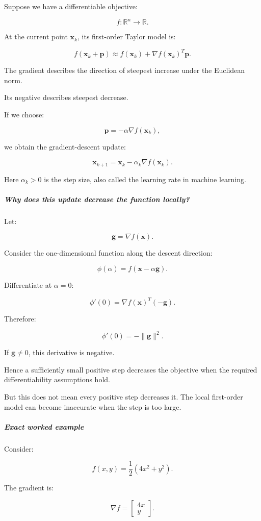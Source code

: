 Suppose we have a differentiable objective:

\[
f:\mathbb R^n\to\mathbb R.
\]

At the current point \(\mathbf x_k\), its first-order Taylor model is:

\[
f(\mathbf x_k+\mathbf p) \approx f(\mathbf x_k)+\nabla f(\mathbf x_k)^T\mathbf p.
\]

The gradient describes the direction of steepest increase under the Euclidean norm.

Its negative describes steepest decrease.

If we choose:

\[
\mathbf p=-\alpha\nabla f(\mathbf x_k),
\]

we obtain the gradient-descent update:

\[
\boxed{ \mathbf x_{k+1} = \mathbf x_k-\alpha_k\nabla f(\mathbf x_k) }.
\]

Here \(\alpha_k>0\) is the step size, also called the learning rate in machine learning.

\subparagraph{Why does this update decrease the function locally?}\label{why-does-this-update-decrease-the-function-locally}

Let:

\[
\mathbf g=\nabla f(\mathbf x).
\]

Consider the one-dimensional function along the descent direction:

\[
\phi(\alpha)=f(\mathbf x-\alpha\mathbf g).
\]

Differentiate at \(\alpha=0\):

\[
\phi'(0)= \nabla f(\mathbf x)^T(-\mathbf g).
\]

Therefore:

\[
\boxed{ \phi'(0)=-\|\mathbf g\|^2 }.
\]

If \(\mathbf g\ne0\), this derivative is negative.

Hence a sufficiently small positive step decreases the objective when the required differentiability assumptions hold.

But this does not mean every positive step decreases it. The local first-order model can become inaccurate when the step is too large.

\subparagraph{Exact worked example}\label{exact-worked-example}

Consider:

\[
f(x,y)=\frac12(4x^2+y^2).
\]

The gradient is:

\[
\nabla f= \begin{bmatrix} 4x\\y \end{bmatrix}.
\]


